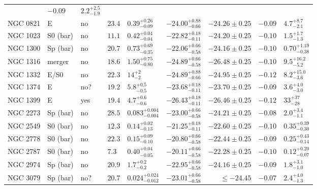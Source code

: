 \begin{table*}
\begin{center}
\begin{tabular}{llllllrll}
 &  $-0.09$  &  $2.2_{-1.9}^{+2.5}$   \\ 
NGC 0821  &  E  &  no   &  $23.4$  &  $0.39_{-0.09}^{+0.26}$   &  $-24.00_{-0.66}^{+0.88}$   &  $-24.26 \pm 0.25$ 
 &  $-0.09$  &  $4.7_{-2.1}^{+8.7}$   \\ 
NGC 1023  &  S0 (bar)  &  no   &  $11.1$  &  $0.42_{-0.04}^{+0.04}$   &  $-22.82_{-0.11}^{+0.18}$   &  $-24.20 \pm 0.25$ 
 &  $-0.10$  &  $1.5_{-1.3}^{+1.7}$   \\ 
NGC 1300  &  Sp (bar)  &  no   &  $20.7$  &  $0.73_{-0.35}^{+0.69}$   &  $-22.06_{-0.58}^{+0.66}$   &  $-24.16 \pm 0.25$ 
 &  $-0.10$  &  $0.70_{-0.38}^{+1.19}$   \\ 
NGC 1316  &  merger  &  no   &  $18.6$  &  $1.50_{-0.80}^{+0.75}$   &  $-24.89_{-0.58}^{+0.66}$   &  $-26.48 \pm 0.25$ 
 &  $-0.10$  &  $9.5_{-5.2}^{+16.2}$   \\ 
NGC 1332  &  E/S0  &  no   &  $22.3$  &  $14_{-2}^{+2}$   &  $-24.89_{-0.66}^{+0.88}$   &  $-24.95 \pm 0.25$ 
 &  $-0.12$  &  $8.2_{-3.6}^{+15.0}$   \\ 
NGC 1374  &  E  &  no?  &  $19.2$  &  $5.8_{-0.5}^{+0.5}$   &  $-23.68_{-0.11}^{+0.18}$   &  $-23.70 \pm 0.25$ 
 &  $-0.09$  &  $3.6_{-3.0}^{+4.0}$   \\ 
NGC 1399  &  E  &  yes   &  $19.4$  &  $4.7_{-0.6}^{+0.6}$   &  $-26.43_{-0.11}^{+0.18}$   &  $-26.46 \pm 0.25$ 
 &  $-0.12$  &  $33_{-28}^{+37}$   \\ 
NGC 2273  &  Sp (bar)  &  no   &  $28.5$  &  $0.083_{-0.004}^{+0.004}$   &  $-23.00_{-0.58}^{+0.66}$   &  $-24.21 \pm 0.25$ 
 &  $-0.08$  &  $2.0_{-1.1}^{+3.4}$   \\ 
NGC 2549  &  S0 (bar)  &  no   &  $12.3$  &  $0.14_{-0.13}^{+0.02}$   &  $-21.25_{-0.11}^{+0.18}$   &  $-22.60 \pm 0.25$ 
 &  $-0.10$  &  $0.35_{-0.30}^{+0.39}$   \\ 
NGC 2778  &  S0 (bar)  &  no   &  $22.3$  &  $0.15_{-0.10}^{+0.09}$   &  $-20.80_{-0.58}^{+0.66}$   &  $-22.44 \pm 0.25$ 
 &  $-0.09$  &  $0.25_{-0.14}^{+0.43}$   \\ 
NGC 2787  &  S0 (bar)  &  no   &  $7.3$  &  $0.40_{-0.05}^{+0.04}$   &  $-20.11_{-0.58}^{+0.66}$   &  $-22.28 \pm 0.25$ 
 &  $-0.10$  &  $0.12_{-0.07}^{+0.20}$   \\ 
NGC 2974  &  Sp (bar)  &  no   &  $20.9$  &  $1.7_{-0.2}^{+0.2}$   &  $-22.95_{-0.58}^{+0.66}$   &  $-24.16 \pm 0.25$ 
 &  $-0.09$  &  $1.8_{-1.0}^{+3.1}$   \\ 
NGC 3079  &  Sp (bar)  &  no?  &  $20.7$  &  $0.024_{-0.012}^{+0.024}$   &  $-23.01_{-0.58}^{+0.66}$   &  $\leq-24.45$   &  $-0.07$  &  $2.4_{-1.3}^{+4.0}$   \\ 

\end{tabular}
\end{center}
\end{table*}
